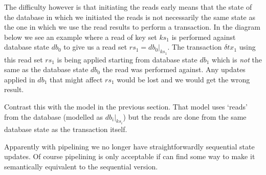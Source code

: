 \documentclass[11pt,a4paper]{article}
\newcommand\restrict[2]{\left.#1\right|_{#2}}
\begin{document}
The difficulty however is that initiating the reads early means that the state
of the database in which we initiated the reads is not necessarily the same
state as the one in which we use the read results to perform a transaction.
In the diagram below we see an example where a read of key set $\mathit{ks}_1$
is performed against database state $\mathit{db}_0$ to give us a read set
$\mathit{rs}_1 = \restrict{\mathit{db}_0}{\mathit{ks}_1}$. The transaction
$\delta\mathit{tx}_1$ using this read set $\mathit{rs}_1$ is being applied
starting from database state $\mathit{db}_1$ which is \emph{not} the same as
the database state $\mathit{db}_0$ the read was performed against. Any updates
applied in $\mathit{db}_1$ that might affect $\mathit{rs}_1$ would be lost and
we would get the wrong result.
\begin{center}
\end{center}
Contrast this with the model in the previous section. That model uses `reads'
from the database (modelled as $\restrict{\mathit{db}_i}{\mathit{ks}_i}$) but
the reads are done from the same database state as the transaction itself.

Apparently with pipelining we no longer have straightforwardly sequential state
updates. Of course pipelining is only acceptable if can find some way to make
it semantically equivalent to the sequential version.
\end{document}
